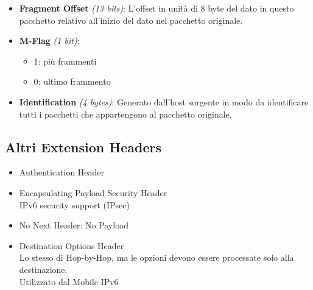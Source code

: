 \documentclass{article}
\begin{document}
\begin{itemize}
    \item \textbf{Fragment Offset} \textit{(13 bits)}: L’offset in unità di 8 byte del dato in questo pacchetto relativo all’inizio del dato nel pacchetto originale.
    \item \textbf{M-Flag} \textit{(1 bit)}:
    \begin{itemize}
        \item 1: più frammenti
        \item 0: ultimo frammento
    \end{itemize}
    \item \textbf{Identification} \textit{(4 bytes)}: Generato dall’host sorgente in modo da identificare tutti i pacchetti che appartengono al pacchetto originale.
\end{itemize}

\subsection{Altri Extension Headers}
\begin{itemize}
    \item Authentication Header
    \item Encapsulating Payload Security Header \\
    IPv6 security support (IPsec)
    \item No Next Header: No Payload
    \item Destination Options Header \\
    Lo stesso di Hop-by-Hop, ma le opzioni devono essere processate solo alla destinazione. \\
    Utilizzato dal Mobile IPv6
\end{itemize}

\newpage
\end{document}

